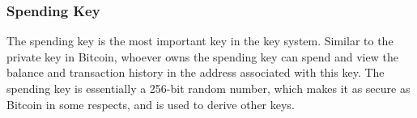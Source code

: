 \subsubsection{Spending Key}\label{section: spending-key}

The spending key is the most important key in the key system. Similar to the private key in Bitcoin, whoever owns the spending key can spend and view the balance and transaction history in the address associated with this key. The spending key is essentially a 256-bit random number, which makes it as secure as Bitcoin in some respects, and is used to derive other keys.
